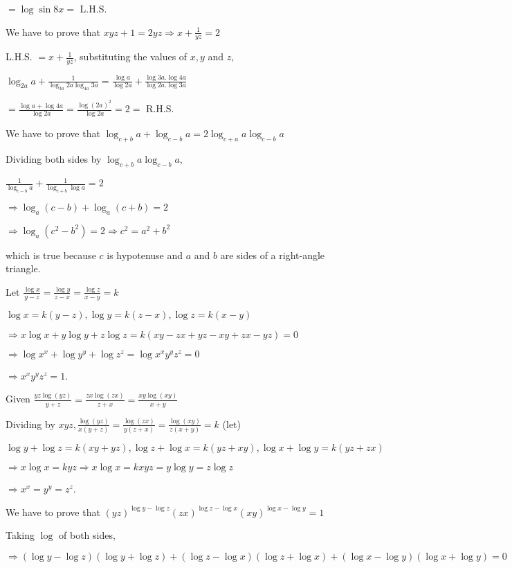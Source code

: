   $= \log\sin8x =$ L.H.S.
\item We have to prove that $xyz + 1 = 2yz \Rightarrow x + \frac{1}{yz} = 2$

  L.H.S. $= x + \frac{1}{yz}$, substituting the values of $x, y$ and $z$,

  $\log_{2a}a + \frac{1}{\log_{3a}2a\log_{4a}3a} = \frac{\log a}{\log 2a} + \frac{\log 3a.\log 4a}{\log 2a.\log 3a}$

  $= \frac{\log a + \log 4a}{\log 2a} = \frac{\log(2a)^2}{\log 2a} = 2 =$ R.H.S.
\item We have to prove that $\log_{c + b}a + \log_{c - b}a = 2\log_{c + a}a\log_{c - b}a$

  Dividing both sides by $\log_{c + b}a\log_{c - b}a$,

  $\frac{1}{\log_{c - b}a} + \frac{1}{\log_{c + b}\log a} = 2$

  $\Rightarrow \log_a(c - b) + \log_a(c + b) = 2$

  $\Rightarrow \log_a(c^2 - b^2) = 2\Rightarrow c^2 = a^2 + b^2$

  which is true because $c$ is hypotenuse and $a$ and $b$ are sides of a right-angle triangle.
\item Let $\frac{\log x}{y - z} = \frac{\log y}{z - x} = \frac{\log z}{x - y} = k$

  $\log x = k(y - z), \log y = k(z - x), \log z = k(x - y)$

  $\Rightarrow x\log x + y\log y + z\log z = k(xy - zx + yz - xy + zx - yz) = 0$

  $\Rightarrow \log x^x + \log y^y + \log z^z = \log x^xy^yz^z = 0$

  $\Rightarrow x^xy^yz^z = 1$.
\item Given $\frac{yz\log(yz)}{y + z} = \frac{zx\log(zx)}{z + x} = \frac{xy\log(xy)}{x + y}$

  Dividing by $xyz, \frac{\log(yz)}{x(y + z)} = \frac{\log(zx)}{y(z + x)} = \frac{\log(xy)}{z(x + y)} = k$ (let)

  $\log y + \log z = k(xy + yz), \log z + \log x = k(yz + xy), \log x + \log y = k(yz + zx)$

  $\Rightarrow x\log x = kyz \Rightarrow x\log x = kxyz = y\log y = z\log z$

  $\Rightarrow x^x = y^y = z^z$.
\item We have to prove that $(yz)^{\log y - \log z}(zx)^{\log z - \log x}(xy)^{\log x - \log y} = 1$

  Taking $\log$ of both sides,

  $\Rightarrow (\log y - \log z)(\log y + \log z) + (\log z - \log x)(\log z + \log x) + (\log x - \log y)(\log x + \log y) = 0$

